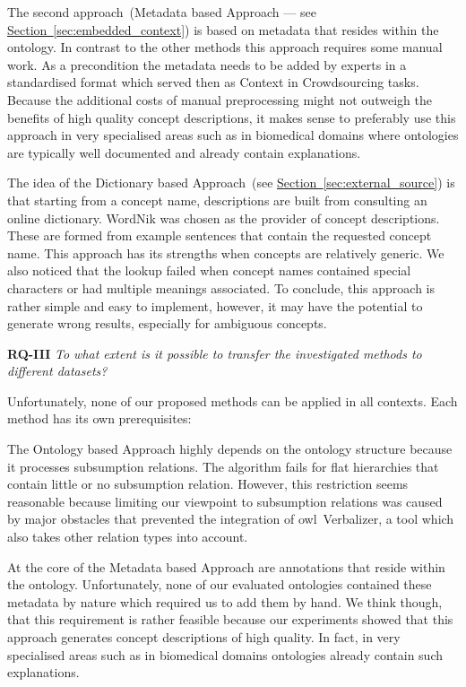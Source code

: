The second approach~(Metadata based Approach --- see \hyperref[sec:embedded_context]{Section~\ref*{sec:embedded_context}})
is based on metadata that resides within the ontology. In contrast to the other methods this approach requires some manual work. As a precondition 
the metadata needs to be added by experts in a standardised format which served then as Context in Crowdsourcing tasks. Because the additional costs of manual preprocessing might not outweigh the benefits of high quality concept descriptions, it makes sense to preferably use this approach in very specialised areas such as in biomedical domains where ontologies are typically well documented and already contain explanations.

The idea of the Dictionary based Approach~(see \hyperref[sec:external_source]{Section~\ref*{sec:external_source}})
is that starting from a concept name, descriptions are built from consulting an online dictionary. WordNik was chosen as the provider of concept descriptions. These are formed from example sentences that contain the requested concept name. This approach has its strengths when concepts are relatively generic. We also noticed that the lookup failed when concept names contained special characters or had multiple meanings associated. 
To conclude, this approach is rather simple and easy to implement, however, it may have the potential to generate wrong results, especially for ambiguous concepts. 


\textbf{RQ-III} \emph{To what extent is it possible to transfer the investigated methods to different datasets?}

Unfortunately, none of our proposed methods can be applied in all contexts. Each method has its own prerequisites:

The Ontology based Approach highly depends on the ontology structure because it processes subsumption relations. The algorithm fails for flat hierarchies that contain little or no subsumption relation. However, this restriction seems reasonable because limiting our viewpoint to subsumption relations was caused by major obstacles that prevented the integration of \gls{owl}~Verbalizer, a tool which also takes other relation types into account. 

At the core of the Metadata based Approach are annotations that reside within the ontology. Unfortunately, none of our evaluated ontologies contained these metadata by nature which required us to add them by hand. We think though, that this requirement is rather feasible because our experiments showed that this approach generates concept descriptions of high quality.  In fact, in very specialised areas such as in biomedical domains ontologies already contain such explanations. 

